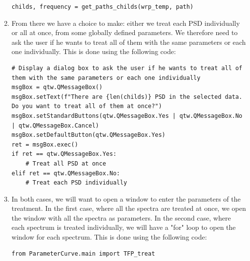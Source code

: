 \documentclass{book}
\begin{document}
\begin{enumerate}
\begin{lstlisting}
childs, frequency = get_paths_childs(wrp_temp, path)
\end{lstlisting}
        \item From there we have a choice to make: either we treat each PSD individually or all at once, from some globally defined parameters. We therefore need to ask the user if he wants to treat all of them with the same parameters or each one individually. This is done using the following code:
\begin{lstlisting}
# Display a dialog box to ask the user if he wants to treat all of them with the same parameters or each one individually
msgBox = qtw.QMessageBox()        
msgBox.setText(f"There are {len(childs)} PSD in the selected data. Do you want to treat all of them at once?")
msgBox.setStandardButtons(qtw.QMessageBox.Yes | qtw.QMessageBox.No | qtw.QMessageBox.Cancel)
msgBox.setDefaultButton(qtw.QMessageBox.Yes)
ret = msgBox.exec()
if ret == qtw.QMessageBox.Yes: 
    # Treat all PSD at once
elif ret == qtw.QMessageBox.No:
    # Treat each PSD individually
\end{lstlisting}
        \item In both cases, we will want to open a window to enter the parameters of the treatment. In the first case, where all the spectra are treated at once, we open the window with all the spectra as parameters. In the second case, where each spectrum is treated individually, we will have a "for" loop to open the window for each spectrum. This is done using the following code:
\begin{lstlisting}
from ParameterCurve.main import TFP_treat


\end{lstlisting}
\end{enumerate}
\end{document}
